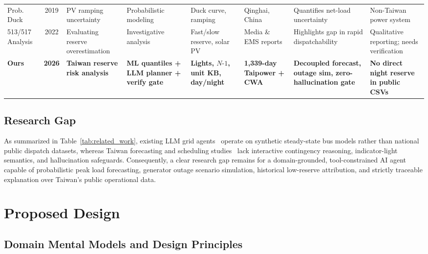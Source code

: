 \documentclass[conference]{IEEEtran}
\begin{document}
\begin{table}[t]
\begin{tabularx}{\textwidth}{@{}p{1.55cm}cp{2.1cm}>{\raggedright\arraybackslash}X>{\raggedright\arraybackslash}X p{1.9cm}>{\raggedright\arraybackslash}X>{\raggedright\arraybackslash}X@{}}
\cite{ref29} Prob. Duck & 2019 & PV ramping uncertainty & Probabilistic modeling & Duck curve, ramping & Qinghai, China & Quantifies net-load uncertainty & Non-Taiwan power system \\
\cite{ref14} 513/517 Analysis & 2022 & Evaluating reserve overestimation & Investigative analysis & Fast/slow reserve, solar PV & Media \& EMS reports & Highlights gap in rapid dispatchability & Qualitative reporting; needs verification \\
\midrule
\textbf{Ours} & \textbf{2026} & \textbf{Taiwan reserve risk analysis} & \textbf{ML quantiles + LLM planner + verify gate} & \textbf{Lights, $N\text{-}1$, unit KB, day/night} & \textbf{1,339-day Taipower + CWA} & \textbf{Decoupled forecast, outage sim, zero-hallucination gate} & \textbf{No direct night reserve in public CSVs} \\
\bottomrule
\end{tabularx}
\end{table}

\subsection{Research Gap}
\label{sec:research_gap}

As summarized in Table~\ref{tab:related_work}, existing LLM grid agents~\cite{ref20,ref21,ref22} operate on synthetic steady-state bus models rather than national public dispatch datasets, whereas Taiwan forecasting and scheduling studies~\cite{ref26,ref27,ref28} lack interactive contingency reasoning, indicator-light semantics, and hallucination safeguards. Consequently, a clear research gap remains for a domain-grounded, tool-constrained AI agent capable of probabilistic peak load forecasting, generator outage scenario simulation, historical low-reserve attribution, and strictly traceable explanation over Taiwan's public operational data.

\section{Proposed Design}
\label{sec:proposed_design}

\subsection{Domain Mental Models and Design Principles}
\label{sec:mental_models}
\end{document}

